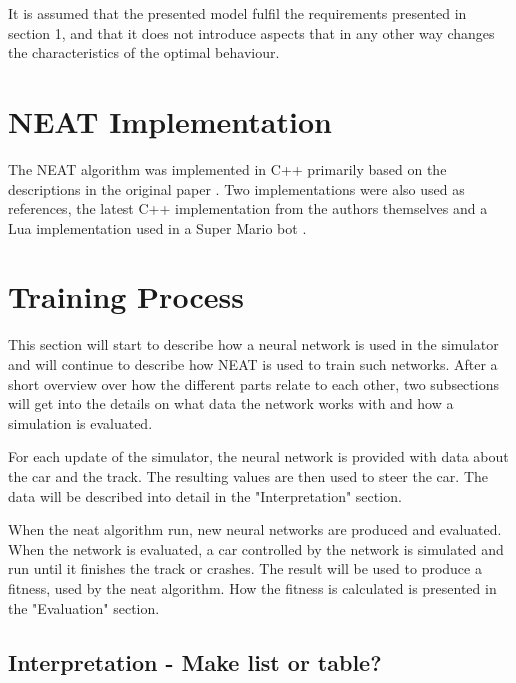 It is assumed that the presented model fulfil the requirements presented in section 1, and that it does not introduce aspects that in any other way changes the characteristics of the optimal behaviour.

\section{NEAT Implementation}

The NEAT algorithm was implemented in C++ primarily based on the descriptions in the original paper \cite{stanley:neat}. Two implementations were also used as references, the latest C++ implementation from the authors themselves \cite{neat_source} and a Lua implementation used in a Super Mario bot \cite{mario_source}. 



\section{Training Process}

This section will start to describe how a neural network is used in the simulator and will continue to describe how NEAT is used to train such networks. After a short overview over how the different parts relate to each other, two subsections will get into the details on what data the network works with and how a simulation is evaluated.

For each update of the simulator, the neural network is provided with data about the car and the track. The resulting values are then used to steer the car. The data will be described into detail in the "Interpretation" section.

When the neat algorithm run, new neural networks are produced and evaluated. When the network is evaluated, a car controlled by the network is simulated and run until it finishes the track or crashes. The result will be used to produce a fitness, used by the neat algorithm. How the fitness is calculated is presented in the "Evaluation" section.

\subsection{Interpretation - Make list or table?}

